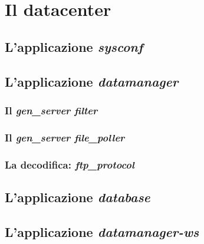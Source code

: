 \clearpage{\pagestyle{empty}\cleardoublepage}
\chapter{Il datacenter}\label{sec:datacenter}
\section{L'applicazione \emph{sysconf}}
\section{L'applicazione \emph{datamanager}}
\subsection{Il \emph{gen\_server filter}}
\subsection{Il \emph{gen\_server file\_poller}}
\subsection{La decodifica: \emph{ftp\_protocol}}
\section{L'applicazione \emph{database}}
\section{L'applicazione \emph{datamanager-ws}}
